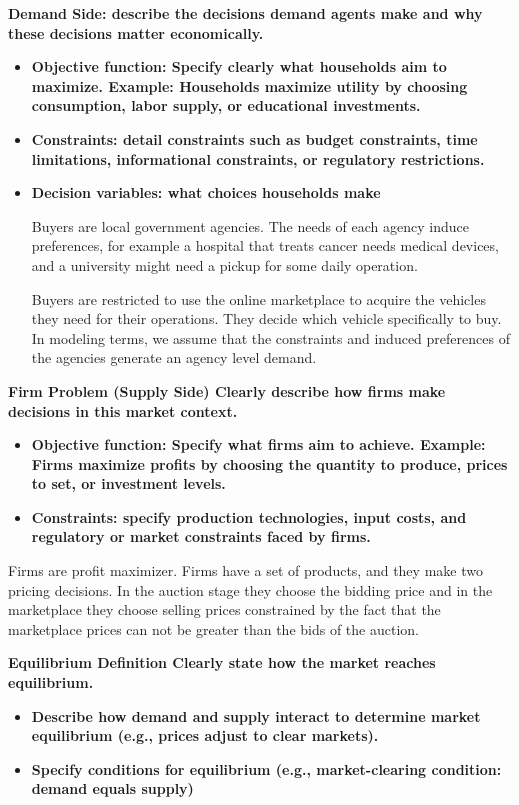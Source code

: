 \documentclass[12pt]{article}
\theoremstyle{plain}
\theoremstyle{plain}
\begin{document}
\textbf{Demand Side: describe the decisions demand agents  make and why these decisions matter economically.}
 
 \begin{itemize}
     \item \textbf{Objective function: Specify clearly what households aim to maximize. Example: Households maximize utility by choosing consumption, labor supply, or educational investments.}

    \item \textbf{Constraints: detail constraints such as budget constraints, time limitations, informational constraints, or regulatory restrictions.}

    \item \textbf{Decision variables: what choices households make }

    Buyers are local government agencies. The needs of each agency induce preferences, for example a hospital that treats cancer needs medical devices, and a university might need a pickup for some daily operation.

    Buyers are restricted to use the online marketplace to acquire the vehicles they need for their operations. They decide which vehicle specifically to buy. In modeling terms, we assume that the constraints and induced preferences of the agencies generate an agency level demand. 

    
 
 \end{itemize}


\textbf{Firm Problem (Supply Side)
 Clearly describe how firms make decisions in this market context.}
 \begin{itemize}
     \item \textbf{Objective function: Specify what firms aim to achieve. Example: Firms maximize profits by choosing the quantity to produce, prices to set, or investment levels.}

     \item \textbf{Constraints: specify production technologies, input costs, and regulatory or market constraints faced by firms.}
 \end{itemize}
Firms are profit maximizer. Firms have a set of products, and they make two pricing decisions. In the auction stage they choose the bidding price and in the marketplace they choose selling prices constrained by the fact that the marketplace prices can not be greater than the bids of the auction. 

\textbf{Equilibrium Definition Clearly state how the market reaches equilibrium.}
\begin{itemize}
    \item \textbf{Describe how demand and supply interact to determine market equilibrium (e.g., prices adjust to clear markets).}

    \item \textbf{Specify conditions for equilibrium (e.g., market-clearing condition: demand equals supply)}
\end{itemize}
\end{document}
